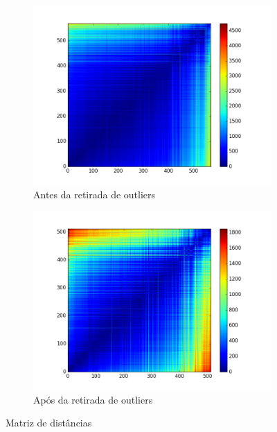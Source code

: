 \documentclass[11pt,a4paper]{article}
\numberwithin{equation}{section}
\begin{document}
\begin{figure}[H]
\centering
\begin{subfigure}{.5\textwidth}
  \centering
  \includegraphics[width=\linewidth]{./img/distance_out}
  \caption{Antes da retirada de outliers}
  \label{fig:antes_out}
\end{subfigure}%
\begin{subfigure}{.5\textwidth}
  \centering
  \includegraphics[width=\linewidth]{./img/distance_clean}
  \caption{Após da retirada de outliers}
  \label{fig:apos_out}
\end{subfigure}
\caption{Matriz de distâncias}
\label{fig:distorig}
\end{figure}
\end{document}
